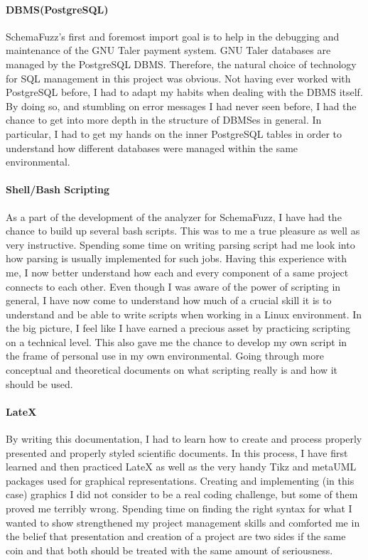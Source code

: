 			\paragraph{DBMS(PostgreSQL)} 
SchemaFuzz's first and foremost import goal is to help in the debugging and maintenance of the GNU Taler payment system. GNU Taler databases are managed by the PostgreSQL DBMS. Therefore, the natural choice of technology for SQL management in this project was obvious.
Not having ever worked with PostgreSQL before, I had to adapt my habits when dealing with the DBMS itself.
By doing so, and stumbling on error messages I had never seen before, I had the chance to get into more depth in the structure of DBMSes in general. In particular, I had to get my hands on the inner PostgreSQL tables in order to understand how different databases were managed within the same environmental.

			\paragraph{Shell/Bash Scripting} 
As a part of the development of the analyzer for SchemaFuzz, I have had the chance to build up several bash scripts. This  was to me a true pleasure as well as very instructive.
Spending some time on writing parsing script had me look into how parsing is usually implemented for such jobs.
Having this experience with me, I now better understand how each and every component of a same project connects to each other. 
Even though I was aware of the power of scripting in general, I have now come to understand how much of a crucial skill it is to understand and be able to write scripts when working in a Linux environment.
In the big picture, I feel like I have earned a precious asset by practicing scripting on a technical level. This also gave me the chance to develop my own script in the frame of personal use in my own environmental. Going through more conceptual and theoretical documents on what scripting really is and how it should be used.
   			
			 \paragraph{LateX}
By writing this documentation, I had to learn how to create and process properly presented and properly styled scientific documents. In this process, I have first learned and then practiced LateX as well as the very handy Tikz and metaUML packages used for graphical representations.
Creating and implementing (in this case) graphics I did not consider to be a real coding challenge, but some of them proved me terribly wrong. Spending time on finding the right syntax for what I wanted to show strengthened my project management skills and comforted me in the belief that presentation and creation of a project are two sides if the same coin and that both should be treated with the same amount of seriousness.  			  
	

